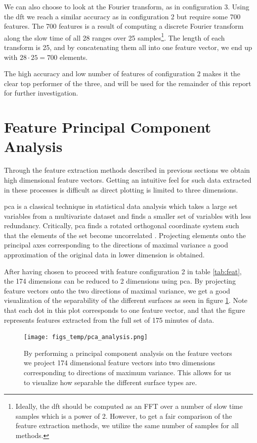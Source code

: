 We can also choose to look at the Fourier transform, as in configuration 3. Using the \gls{dft} we reach a similar accuracy as in configuration 2 but require some 700 features. The 700 features is a result of computing a discrete Fourier transform along the slow time of all 28 ranges over 25 samples\footnote{Ideally, the \gls{dft} should be computed as an FFT over a number of slow time samples which is a power of 2. However, to get a fair comparison of the feature extraction methods, we utilize the same number of samples for all methods.}. The length of each transform is 25, and by concatenating them all into one feature vector, we end up with $28\cdot 25=700$ elements. 

The high accuracy and low number of features of configuration 2 makes it the clear top performer of the three, and will be used for the remainder of this report for further investigation.

\section{Feature Principal Component Analysis}

Through the feature extraction methods described in previous sections we obtain high dimensional feature vectors. Getting an intuitive feel for such data extracted in these processes is difficult as direct plotting is limited to three dimensions. 

\gls{pca} is  a classical technique in statistical data analysis which takes a large set variables from a multivariate dataset and finds a smaller set of variables with less redundancy. Critically, \gls{pca} finds a rotated orthogonal coordinate system such that the elements of the set become uncorrelated \citep{hyvasrinen_karhunen_oja_2004}. Projecting elements onto the principal axes corresponding to the directions of maximal variance a good approximation of the original data in lower dimension is obtained.

After having chosen to proceed with feature configuration 2 in table \ref{tab:feat}, the 174 dimensions can be reduced to 2 dimensions using \gls{pca}. By projecting feature vectors onto the two directions of maximal variance, we get a good visualization of the separability of the different surfaces as seen in figure \ref{fig:pca}. Note that each dot in this plot corresponds to one feature vector, and that the figure represents features extracted from the full set of 175 minutes of data.  

\begin{figure}[h]
	\centering
	\texttt{[image: figs\_temp/pca\_analysis.png]}
	\caption{By performing a principal component analysis on the feature vectors we project 174 dimensional feature vectors into two dimensions corresponding to directions of maximum variance. This allows for us to visualize how separable the different surface types are.}
	\label{fig:pca}
\end{figure}

